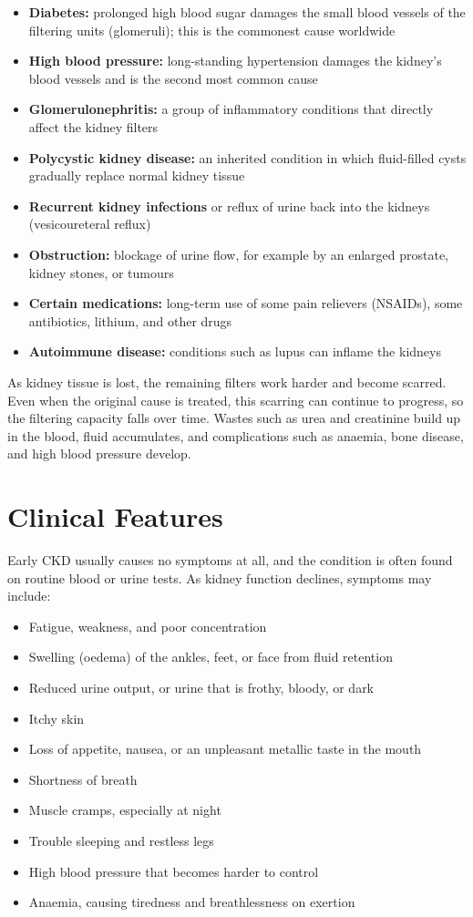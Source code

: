 \begin{itemize}
    \item \textbf{Diabetes:} prolonged high blood sugar damages the small blood vessels of the filtering units (glomeruli); this is the commonest cause worldwide
    \item \textbf{High blood pressure:} long-standing hypertension damages the kidney's blood vessels and is the second most common cause
    \item \textbf{Glomerulonephritis:} a group of inflammatory conditions that directly affect the kidney filters
    \item \textbf{Polycystic kidney disease:} an inherited condition in which fluid-filled cysts gradually replace normal kidney tissue
    \item \textbf{Recurrent kidney infections} or reflux of urine back into the kidneys (vesicoureteral reflux)
    \item \textbf{Obstruction:} blockage of urine flow, for example by an enlarged prostate, kidney stones, or tumours
    \item \textbf{Certain medications:} long-term use of some pain relievers (NSAIDs), some antibiotics, lithium, and other drugs
    \item \textbf{Autoimmune disease:} conditions such as lupus can inflame the kidneys
\end{itemize}

As kidney tissue is lost, the remaining filters work harder and become scarred. Even when the original cause is treated, this scarring can continue to progress, so the filtering capacity falls over time. Wastes such as urea and creatinine build up in the blood, fluid accumulates, and complications such as anaemia, bone disease, and high blood pressure develop.

\section*{Clinical Features}
Early CKD usually causes no symptoms at all, and the condition is often found on routine blood or urine tests. As kidney function declines, symptoms may include:

\begin{itemize}
    \item Fatigue, weakness, and poor concentration
    \item Swelling (oedema) of the ankles, feet, or face from fluid retention
    \item Reduced urine output, or urine that is frothy, bloody, or dark
    \item Itchy skin
    \item Loss of appetite, nausea, or an unpleasant metallic taste in the mouth
    \item Shortness of breath
    \item Muscle cramps, especially at night
    \item Trouble sleeping and restless legs
    \item High blood pressure that becomes harder to control
    \item Anaemia, causing tiredness and breathlessness on exertion
\end{itemize}

